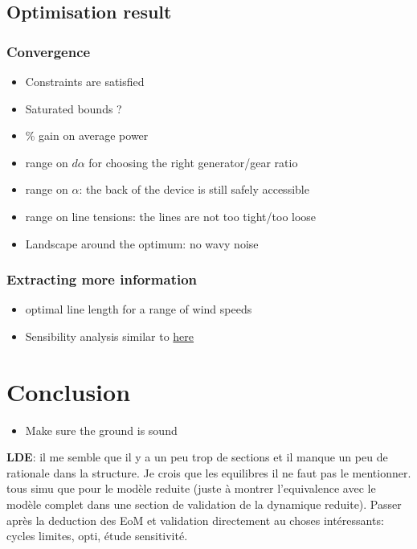 \subsection{Optimisation result}

\subsubsection{Convergence}
\begin{itemize}
 \item Constraints are satisfied
 \item Saturated bounds ?
 \item \% gain on average power
 \item range on $d\alpha$ for choosing the right generator/gear ratio
 \item range on $\alpha$: the back of the device is still safely accessible
 \item range on line tensions: the lines are not too tight/too loose
 \item Landscape around the optimum: no wavy noise
\end{itemize}

\subsubsection{Extracting more information}
\begin{itemize}
 \item optimal line length for a range of wind speeds
 \item Sensibility analysis similar to \href{https://www.researchgate.net/figure/llustrative-example-of-one-way-local-sensitivity-analysis-showing-the-effect-of-CAPEX_fig2_350607886}{here}
\end{itemize}

\section{Conclusion}
\begin{itemize}
 \item Make sure the ground is sound
\end{itemize}

\textbf{LDE}: il me semble que il y a un peu trop de sections et il manque un peu de rationale dans la structure. Je crois que les equilibres il ne faut pas le mentionner. tous simu que pour le modèle reduite (juste à montrer l'equivalence avec le modèle complet dans une section de validation de la dynamique reduite). Passer après la deduction des EoM et validation directement au choses intéressants: cycles limites, opti, étude sensitivité.